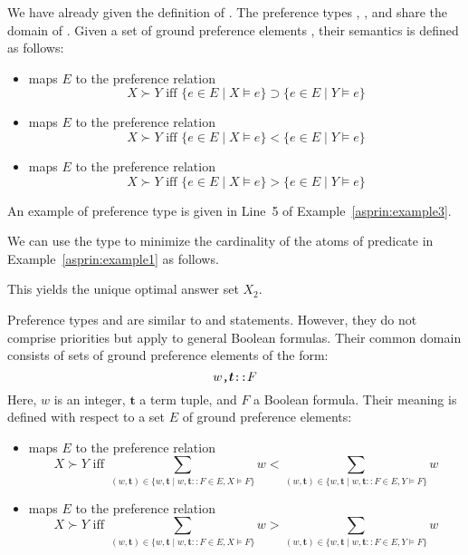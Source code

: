 We have already given the definition of . 
The preference types , , and  share the domain of .
Given a set of ground preference elements ,
their semantics is defined as follows:
\begin{itemize}
\item
{} maps $E$ to the preference relation
\[
X \succ Y \text{ iff } \{e\in E\mid X\models e\}\supset\{e\in E\mid Y\models e\}
\]
\item
{} maps $E$ to the preference relation
\[
X \succ Y \text{ iff } \{e\in E\mid X\models e\}<\{e\in E\mid Y\models e\}
\]
\item
{} maps $E$ to the preference relation
\[
X \succ Y \text{ iff } \{e\in E\mid X\models e\}>\{e\in E\mid Y\models e\}
\]
\end{itemize}
An example of preference type  is given in Line~5 of Example~\ref{asprin:example3}.
%
\begin{example}
%
%
We can use the type  to minimize the cardinality of the atoms of predicate 
in Example~\ref{asprin:example1} as follows.
%

%
This yields the unique optimal answer set $X_2$.
\end{example}

Preference types  and 
are similar to  and  statements.
However, they do not comprise priorities but apply to general Boolean formulas.
Their common domain consists of sets of ground preference elements of the form:
\[w\texttt{,}\boldsymbol{t}\texttt{::}F\]
Here, ${w}$ is an integer, $\boldsymbol{t}$ a term tuple, and $F$ a Boolean formula. 
%
Their meaning is defined with respect to a set $E$ of ground preference elements:
\begin{itemize}
\item
{} maps $E$ to the preference relation
\[
X \succ Y 
\text{ iff }
\sum_{(w,\boldsymbol{t})\in\{w,\boldsymbol{t}\mid w,\boldsymbol{t}\mathtt{::}F\in E, X\models F\}}w
<
\sum_{(w,\boldsymbol{t})\in\{w,\boldsymbol{t}\mid w,\boldsymbol{t}\mathtt{::}F\in E, Y\models F\}}w
\]
\item
{} maps $E$ to the preference relation
\[
X \succ Y 
\text{ iff }
\sum_{(w,\boldsymbol{t})\in\{w,\boldsymbol{t}\mid w,\boldsymbol{t}\mathtt{::}F\in E, X\models F\}}w
>
\sum_{(w,\boldsymbol{t})\in\{w,\boldsymbol{t}\mid w,\boldsymbol{t}\mathtt{::}F\in E, Y\models F\}}w
\]
\end{itemize}

